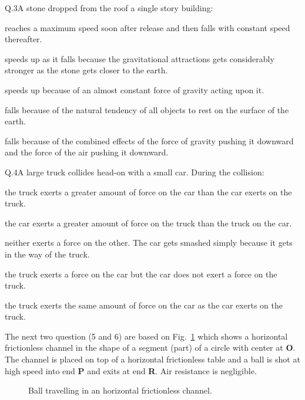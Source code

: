     \begin{mcq}{Q.3}{A stone dropped from the roof a single story building:}

            \item reaches a maximum speed soon after release and then falls with constant speed thereafter.
            \item speeds up as it falls because the gravitational attractions gets considerably stronger as the stone gets closer to the earth.
            \item speeds up because of an almost constant force of gravity acting upon it.
            \item falls because of the natural tendency of all objects to rest on the surface of the earth.
            \item falls because of the combined effects of the force of gravity pushing it downward and the force of the air pushing it downward.
    \end{mcq}


    \begin{mcq}{Q.4}{A large truck collides head-on with a small car. During the collision:}

            \item the truck exerts a greater amount of force on the car than the car exerts on the truck.
            \item the car exerts a greater amount of force on the truck than the truck on the car.
            \item neither exerts a force on the other. The car gets smashed simply because it gets in the way of the truck.
            \item the truck exerts a force on the car but the car does not exert a force on the truck.
            \item the truck exerts the same amount of force on the car as the car exerts on the truck.
    \end{mcq}

    \eline[2]
    The next two question (5 and 6) are based on Fig.~\ref{fig:circular_channel} which shows a horizontal frictionless channel in the shape of a segment (part) of a circle with center at \textbf{O}.
    The channel is placed on top of a horizontal frictionless table and a ball is shot at high speed into end \textbf{P} and exits at end \textbf{R}.
    Air resistance is negligible.

    \begin{figure}[h!]
        \begin{center}
            \eline[]
            
            \caption{\label{fig:circular_channel} Ball travelling in an horizontal frictionless channel.}
        \end{center}
    \end{figure}

